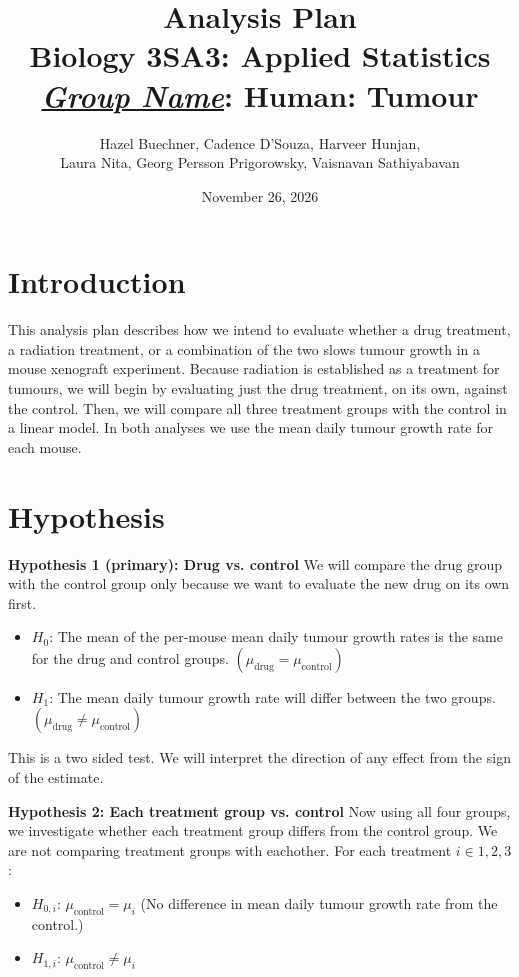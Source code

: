 \documentclass[12pt]{article}\usepackage[]{graphicx}\usepackage[]{xcolor}
\title{%
  {\bfseries Analysis Plan}\\[0.75em]
  \large Biology 3SA3: Applied Statistics\\[0.5em]
  \large\underline{\emph{Group Name}}: Human: Tumour
}
\author{Hazel Buechner, Cadence D'Souza, Harveer Hunjan,\\
  Laura Nita, Georg Persson Prigorowsky, Vaisnavan Sathiyabavan}
\date{November 26, 2026}
\begin{document}
\maketitle



\section{Introduction}

This analysis plan describes how we intend to evaluate whether a drug treatment, a radiation treatment, or a combination of the two slows tumour growth in a mouse xenograft experiment. Because radiation is established as a treatment for tumours, we will begin by evaluating just the drug treatment, on its own, against the control. Then, we will compare all three treatment groups with the control in a linear model. In both analyses we use the mean daily tumour growth rate for each mouse. 

\section{Hypothesis}

\textbf{Hypothesis 1 (primary): Drug vs. control} We will compare the drug group with the control group only because we want to evaluate the new drug on its own first. 

\begin{itemize}

\item $H_0$: The mean of the per-mouse mean daily tumour growth rates is the same for the drug and control groups. $(\mu_{\text{drug}}=\mu_{\text{control}})$

\item $H_1$: The mean daily tumour growth rate will differ between the two groups. $(\mu_{\text{drug}} \neq \mu_{\text{control}})$

\end{itemize}

This is a two sided test. We will interpret the direction of any effect from the sign of the estimate. 

\textbf{Hypothesis 2: Each treatment group vs. control} Now using all four groups, we investigate whether each treatment group differs from the control group. We are not comparing treatment groups with eachother. For each treatment $i \in {1, 2, 3}$:

\begin{itemize}

\item $H_{0, i}$: $\mu_{\text{control}}=\mu_i$ (No difference in mean daily tumour growth rate from the control.)

\item $H_{1, i}$: $\mu_{\text{control}}\neq\mu_i$

\end{itemize}
\end{document}
